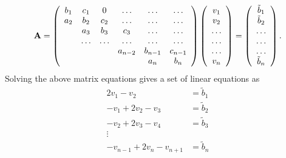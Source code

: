 \begin{align}
	\mbox{\textbf{A}} = \left(\begin{array}{cccccc}
                           b_1& c_1 & 0 &\dots   & \dots &\dots \\
                           a_2 & b_2 & c_2 &\dots &\dots &\dots \\
                           & a_3 & b_3 & c_3 & \dots & \dots \\
                           & \dots   & \dots &\dots   &\dots & \dots \\
                           &   &  &a_{n-2}  &b_{n-1}& c_{n-1} \\
                           &    &  &   &a_n & b_n \\
                      \end{array} \right)\left(\begin{array}{c}
                           v_1\\
                           v_2\\
                           \dots \\
                          \dots  \\
                          \dots \\
                           v_n\\
                      \end{array} \right)
  =\left(\begin{array}{c}
                           \tilde{b}_1\\
                           \tilde{b}_2\\
                           \dots \\
                           \dots \\
                          \dots \\
                           \tilde{b}_n\\
                      \end{array} \right).
	\label{eq:Nature5}
\end{align}
Solving the above matrix equations gives a set of linear equations as 
\begin{align}
	2v_1 - v_2 &= \tilde{b}_1 \\
	-v_1 + 2v_2 -v_3 &= \tilde{b}_2 \\
	-v_2 + 2v_3 -v_4 &= \tilde{b}_3 \\
	\vdots \\
	-v_{n-1} + 2v_n -v_{n+1} &= \tilde{b}_n 
	\label{eq:Nature6}
\end{align}
